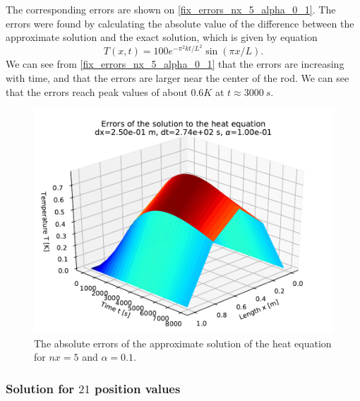 The corresponding errors are shown on \autoref{fix_errors_nx_5_alpha_0_1}. The errors were found by calculating the absolute value of the difference between the approximate solution and the exact solution, which is given by equation
\[
  T(x,t) = 100 e^{- \pi^2 k t / L^2} \sin(\pi x / L).
\]
We can see from \autoref{fix_errors_nx_5_alpha_0_1} that the errors are increasing with time, and that the errors are larger near the center of the rod. We can see that the errors reach peak values of about $0.6 K$ at $t \approx 3000 \ s$.
\begin{figure}[H]
  \centering
  \includegraphics[width=1.0\textwidth]{figures/errors_alpha_1_00e_01.pdf}
  \caption{The absolute errors of the approximate solution of the heat equation for $nx=5$ and $\alpha = 0.1$.}
  \label{fix_errors_nx_5_alpha_0_1}
\end{figure}


\subsubsection*{Solution for $21$ position values}

